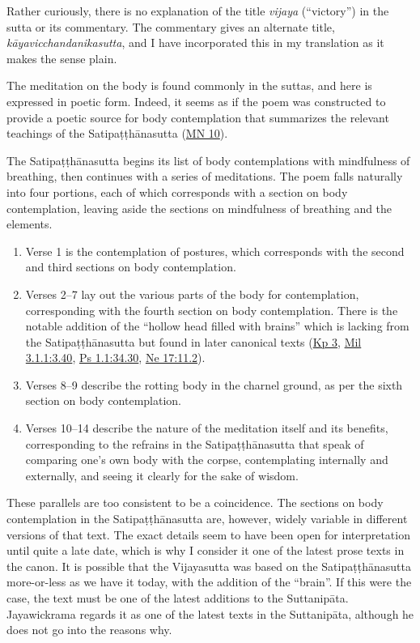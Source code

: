 \documentclass[12pt,openany]{book}%
\begin{document}
Rather curiously, there is no explanation of the title \textit{vijaya} (“victory”) in the sutta or its commentary. The commentary gives an alternate title, \textit{\textsanskrit{kāyavicchandanikasutta}}, and I have incorporated this in my translation as it makes the sense plain.

The meditation on the body is found commonly in the suttas, and here is expressed in poetic form. Indeed, it seems as if the poem was constructed to provide a poetic source for body contemplation that summarizes the relevant teachings of the \textsanskrit{Satipaṭṭhānasutta} (\href{https://suttacentral.net/mn10/en/sujato}{MN 10}).

The \textsanskrit{Satipaṭṭhānasutta} begins its list of body contemplations with mindfulness of breathing, then continues with a series of meditations. The poem falls naturally into four portions, each of which corresponds with a section on body contemplation, leaving aside the sections on mindfulness of breathing and the elements.

\begin{enumerate}%
\item Verse 1 is the contemplation of postures, which corresponds with the second and third sections on body contemplation.%
\item Verses 2–7 lay out the various parts of the body for contemplation, corresponding with the fourth section on body contemplation. There is the notable addition of the “hollow head filled with brains” which is lacking from the \textsanskrit{Satipaṭṭhānasutta} but found in later canonical texts (\href{https://suttacentral.net/kp3}{Kp 3}, \href{https://suttacentral.net/mil3.1.1}{Mil 3.1.1:3.40}, \href{https://suttacentral.net/ps1.1}{Ps 1.1:34.30}, \href{https://suttacentral.net/ne17}{Ne 17:11.2}).%
\item Verses 8–9 describe the rotting body in the charnel ground, as per the sixth section on body contemplation.%
\item Verses 10–14 describe the nature of the meditation itself and its benefits, corresponding to the refrains in the \textsanskrit{Satipaṭṭhānasutta} that speak of comparing one’s own body with the corpse, contemplating internally and externally, and seeing it clearly for the sake of wisdom.%
\end{enumerate}

These parallels are too consistent to be a coincidence. The sections on body contemplation in the \textsanskrit{Satipaṭṭhānasutta} are, however, widely variable in different versions of that text. The exact details seem to have been open for interpretation until quite a late date, which is why I consider it one of the latest prose texts in the canon. It is possible that the Vijayasutta was based on the \textsanskrit{Satipaṭṭhānasutta} more-or-less as we have it today, with the addition of the “brain”. If this were the case, the text must be one of the latest additions to the \textsanskrit{Suttanipāta}. Jayawickrama regards it as one of the latest texts in the \textsanskrit{Suttanipāta}, although he does not go into the reasons why.
\end{document}
